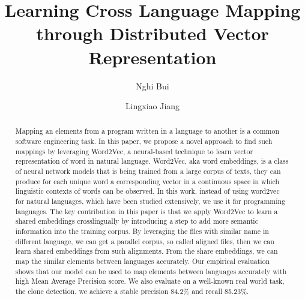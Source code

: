 \documentclass[sigconf]{acmart}
\begin{document}
\title{Learning Cross Language Mapping through Distributed Vector Representation}


\author{Nghi Bui}


\author{Lingxiao Jiang}


\renewcommand{\shortauthors}{Nghi et al.}


\begin{abstract}
Mapping an elements from a program written in a language to another is a common software engineering task. In this paper, we propose a novel approach to find such mappings by leveraging Word2Vec, a neural-based technique to learn vector representation of word in natural language. Word2Vec, aka word embeddings, is a class of neural network models that is being trained from a large corpus of texts, they can produce for each unique word a corresponding vector in a continuous space in which linguistic contexts of words can be observed. In this work, instead of using word2vec for natural languages, which have been studied extensively, we use it for programming languages. The key contribution in this paper is that we apply Word2Vec to learn a shared embeddings crosslingually by introducing a step to add more semantic information into the training corpus. By leveraging the files with similar name in different language, we can get a parallel corpus, so called aligned files, then we can learn shared embeddings from such alignments. From the share embeddings, we can map the similar elements between languages accurately. Our empirical evaluation shows that our model can be used to map elements between languages accurately with high Mean Average Precision score. We also evaluate on a well-known real world task, the clone detection, we achieve a stable precision 84.2\% and recall 85.23\%.
\end{abstract}
\end{document}
